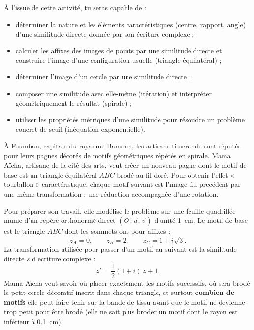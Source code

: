 \documentclass[11pt]{article}
\newcommand{\cle}[1]{{\popxbold\color{popdark}#1}}
\newcounter{popsec}
\newcounter{popsub}
\newcommand{\courssub}[1]{%
  \stepcounter{popsub}%
  \par\vspace{9pt}\noindent{\popxbold\fontsize{11.5}{13}\selectfont\color{popink}{\color{poporange}\thepopsec.\thepopsub}\hspace{6pt}#1}\par\nopagebreak\vspace{4pt}
}
\begin{document}
À l'issue de cette activité, tu seras capable de :
\begin{itemize}
\item déterminer la \cle{nature} et les \cle{éléments caractéristiques} (centre, rapport, angle) d'une similitude directe donnée par son écriture complexe ;
\item calculer les \cle{affixes des images} de points par une similitude directe et construire l'image d'une configuration usuelle (triangle équilatéral) ;
\item déterminer l'\cle{image d'un cercle} par une similitude directe ;
\item \cle{composer} une similitude avec elle-même (itération) et interpréter géométriquement le résultat (spirale) ;
\item utiliser les propriétés métriques d'une similitude pour résoudre un problème concret de seuil (inéquation exponentielle).
\end{itemize}

\courssub{Situation}

À Foumban, capitale du royaume Bamoun, les artisans tisserands sont réputés pour leurs pagnes décorés de motifs géométriques répétés en spirale. Mama Aïcha, artisane de la cité des arts, veut créer un nouveau pagne dont le motif de base est un triangle équilatéral $ABC$ brodé au fil doré. Pour obtenir l'effet « tourbillon » caractéristique, chaque motif suivant est l'image du précédent par une même transformation : une réduction accompagnée d'une rotation.

Pour préparer son travail, elle modélise le problème sur une feuille quadrillée munie d'un repère orthonormé direct $(O\,;\vec{u},\vec{v})$ d'unité \SI{1}{cm}. Le motif de base est le triangle $ABC$ dont les sommets ont pour affixes :
\[ z_A = 0, \qquad z_B = 2, \qquad z_C = 1 + i\sqrt{3}. \]
La transformation utilisée pour passer d'un motif au suivant est la similitude directe $s$ d'écriture complexe :
\[ z' = \frac{1}{2}(1+i)\,z + 1. \]
Mama Aïcha veut savoir où placer exactement les motifs successifs, où sera brodé le petit cercle décoratif inscrit dans chaque triangle, et surtout \textbf{combien de motifs} elle peut faire tenir sur la bande de tissu avant que le motif ne devienne trop petit pour être brodé (elle ne sait plus broder un motif dont le rayon est inférieur à \SI{0,1}{cm}).

\courssub{Consignes}
\end{document}
